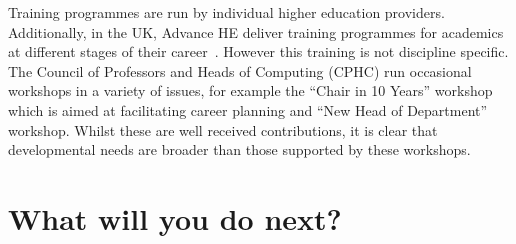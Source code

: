\documentclass[sigconf]{acmart}
\begin{document}
Training programmes are run by individual higher education
providers. Additionally, in the UK, Advance HE deliver training
programmes for academics at different stages of their
career~\cite{HEATraining}. However this training is not discipline
specific. The Council of Professors and Heads of Computing (CPHC) run
occasional workshops in a variety of issues, for example the ``Chair
in 10 Years'' workshop which is aimed at facilitating career planning
and ``New Head of Department'' workshop. Whilst these are well
received contributions, it is clear that developmental needs are
broader than those supported by these workshops.


\section{What will you do next?}
\begin{comment}

Scaling up


Funding 


Shared CPD learning materials


Address EDI issues in computer science


Reverse mentoring


Align with BCS


Special interest group

Web space for repository and functionality (mentoring, buddying) to store CPD sessions, shared resources for new CS academics, examples of good practice and a discussion space.

Explore what BCS are doing with professionals in non academic roles

Encourage research on pedagogy and educational issues in CS

Examine if programme framework is transferrable to other disciplines
\end{comment}
\end{document}
